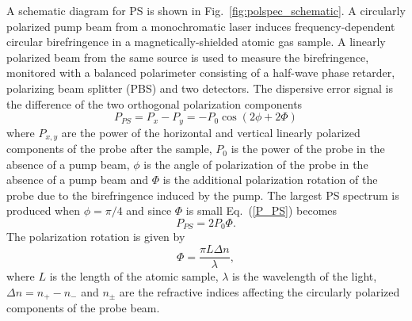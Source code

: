 \documentclass[10pt,letterpaper]{article}
\begin{document}
A schematic diagram for PS is shown in Fig.~\ref{fig:polspec_schematic}.
A circularly polarized pump beam from a monochromatic laser induces frequency-dependent circular birefringence in a magnetically-shielded atomic gas sample.
A linearly polarized beam from the same source is used to measure the birefringence, monitored with a balanced polarimeter consisting of a half-wave phase retarder, polarizing beam splitter (PBS) and two detectors.
The dispersive error signal is the difference of the two orthogonal polarization components~\cite{pearman_polarization_2002, hughes_polarization_2009}
\begin{equation}
P_{PS} = P_x-P_y = -P_0 \cos(2\phi+2\Phi)\label{P_PS}
\end{equation}
where $P_{x,y}$ are the power of the horizontal and vertical linearly polarized components of the probe after the sample, $P_0$ is the power of the probe in the absence of a pump beam, $\phi$ is the angle of polarization of the probe in the absence of a pump beam and $\Phi$ is the additional polarization rotation of the probe due to the birefringence induced by the pump.
The largest PS spectrum is produced when $\phi=\pi/4$ and since $\Phi$ is small Eq.~(\ref{P_PS})  becomes
\begin{equation}
P_{PS} = 2P_0 \Phi.
\end{equation}
The polarization rotation is given by
\begin{equation}
\Phi = \frac{\pi L \Delta n}{\lambda},
\end{equation}
where $L$ is the length of the atomic sample, $\lambda$ is the wavelength of the light, $\Delta n = n_+ - n_-$ and $n_\pm$ are the refractive indices affecting the circularly polarized components of the probe beam.
\end{document}
